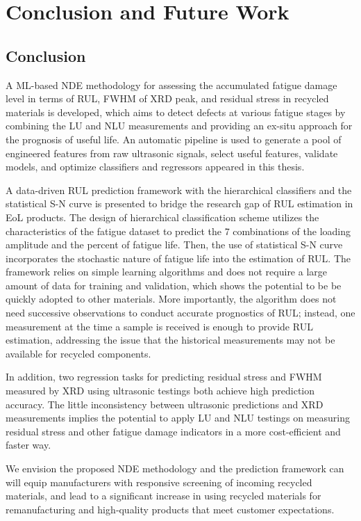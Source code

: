 \chapter{Conclusion and Future Work}
\label{chap: concl}

\section{Conclusion}
A ML-based NDE methodology for assessing the accumulated fatigue damage level in terms of RUL, FWHM of XRD peak, and residual stress in recycled materials is developed, which aims to detect defects at various fatigue stages by combining the LU and NLU measurements and providing an ex-situ approach for the prognosis of useful life. An automatic pipeline is used to generate a pool of engineered features from raw ultrasonic signals, select useful features, validate models, and optimize classifiers and regressors appeared in this thesis. 

A data-driven RUL prediction framework with the hierarchical classifiers and the statistical S-N curve is presented to bridge the research gap of RUL estimation in EoL products. The design of hierarchical classification scheme utilizes the characteristics of the fatigue dataset to predict the 7 combinations of the loading amplitude and the percent of fatigue life. Then, the use of statistical S-N curve incorporates the stochastic nature of fatigue life into the estimation of RUL. The framework relies on simple learning algorithms and does not require a large amount of data for training and validation, which shows the potential to be be quickly adopted to other materials. More importantly, the algorithm does not need successive observations to conduct accurate prognostics of RUL; instead, one measurement at the time a sample is received is enough to provide RUL estimation, addressing the issue that the historical measurements may not be available for recycled components.

In addition, two regression tasks for predicting residual stress and FWHM measured by XRD using ultrasonic testings both achieve high prediction accuracy. The little inconsistency between ultrasonic predictions and XRD measurements implies the potential to apply LU and NLU testings on measuring residual stress and other fatigue damage indicators in a more cost-efficient and faster way.

We envision the proposed NDE methodology and the prediction framework can will equip manufacturers with responsive screening of incoming recycled materials, and lead to a significant increase in using recycled materials for remanufacturing and high‐quality products that meet customer expectations.

